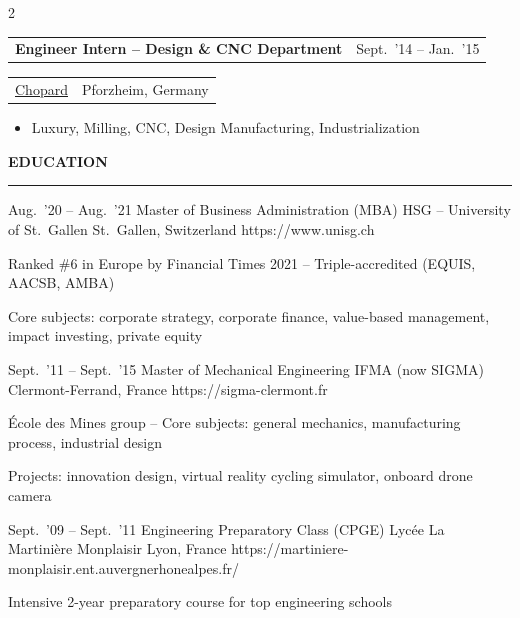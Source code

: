 \documentclass[a4paper,11pt]{article}
\makeatletter
\newlength{\sidebarW}
\newlength{\entryRowGap}          %
\newlength{\entryBottomGap}       %
\newlength{\entryGap}             %
\newlength{\sectionGap}           %
\newlength{\sectionRuleGap}       %
\newlength{\sectionBodyGap}       %
\newcommand{\mainSection}[2][\relax]{%
  \noindent\Large\textbf{%
    \ifx#1\relax\else{\normalsize\color{black}#1\hspace{5pt}}\fi%
    #2%
  }\par\vspace{\sectionRuleGap}%
  \noindent\rule{\linewidth}{0.5pt}\par\vspace{\sectionBodyGap}%
}
\newenvironment{experience}[5]{%
  \noindent\begin{tabular*}{\linewidth}{@{}l@{\extracolsep{\fill}}r@{}}
    {\large\textbf{#2}} & {\small\color{SubtleGray}#1}%
  \end{tabular*}\par\vspace{\entryRowGap}%
  \noindent\begin{tabular*}{\linewidth}{@{}l@{\extracolsep{\fill}}r@{}}
    {\small\href{#5}{\color{CompanyColor}\ul{#3}}} & {\small\color{LocationColor}#4}%
  \end{tabular*}\par\vspace{\entryBottomGap}%
  \begin{itemize}[%
    leftmargin=1.2em,%
    label={\small$\cdot$},%
    itemsep=2pt,%
    parsep=0pt,%
    topsep=0pt,%
    partopsep=0pt%
  ]\small%
}{%
  \end{itemize}\vspace{\entryGap}%
}
\makeatother
\begin{document}
\begin{paracol}{2}
\begin{minipage}[t]{\dimexpr\paperwidth-\sidebarW-22pt\relax}
    \begin{experience}{Sept.~'14 -- Jan.~'15}%
                      {Engineer Intern -- Design \& CNC Department}%
                      {Chopard}%
                      {Pforzheim, Germany}%
                      {https://www.chopard.com}
      \item Luxury, Milling, CNC, Design Manufacturing, Industrialization
    \end{experience}
    \vspace{\sectionGap}

    \mainSection[\faGraduationCap]{EDUCATION}

    \begin{education}{Aug.~'20 -- Aug.~'21}%
                     {Master of Business Administration (MBA)}%
                     {HSG -- University of St.~Gallen}%
                     {St.~Gallen, Switzerland}%
                     {https://www.unisg.ch}
      \item Ranked \#6 in Europe by Financial Times 2021 -- Triple-accredited (EQUIS, AACSB, AMBA)
      \item Core subjects: corporate strategy, corporate finance, value-based management, impact investing, private equity
    \end{education}

    \begin{education}{Sept.~'11 -- Sept.~'15}%
                     {Master of Mechanical Engineering}%
                     {IFMA (now SIGMA)}%
                     {Clermont-Ferrand, France}%
                     {https://sigma-clermont.fr}
      \item \'Ecole des Mines group -- Core subjects: general mechanics, manufacturing process, industrial design
      \item Projects: innovation design, virtual reality cycling simulator, onboard drone camera
    \end{education}

    \begin{education}{Sept.~'09 -- Sept.~'11}%
                     {Engineering Preparatory Class (CPGE)}%
                     {Lycée La Martinière Monplaisir}%
                     {Lyon, France}%
                     {https://martiniere-monplaisir.ent.auvergnerhonealpes.fr/}
      \item Intensive 2-year preparatory course for top engineering schools
    \end{education}

  \end{minipage}%

\end{paracol}
\end{document}
